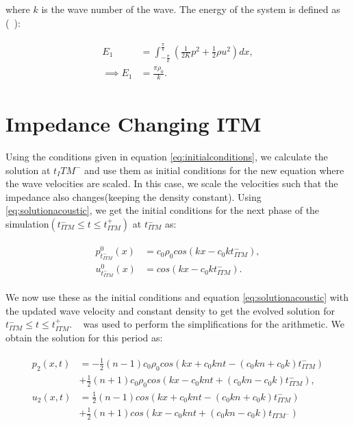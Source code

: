 where $k$ is the wave number of the wave. The energy of the system is defined as (~\parencite{Kopriva2021}):

\begin{align}
    \begin{split}
     E_1 &= \int_{-\frac{\pi}{k}}^{\frac{\pi}{k}} \left(\frac{1}{2K}p^2 + \frac{1}{2}\rho u^2\right) dx , \\
     \implies E_1 &= \frac{\pi\rho_0}{k} .
    \end{split}
    \label{eq:energy}
\end{align}

\section{Impedance Changing \ac{ITM}}\label{section:impedanceconstantITM}
Using the conditions given in equation \ref{eq:initialconditions}, we calculate the solution at $t_ITM^-$ and use them as initial conditions for the new equation where the wave velocities are scaled.
In this case, we scale the velocities such that the impedance also changes(keeping the density constant). Using \ref{eq:solutionacoustic}, we get the initial conditions for the next phase of the simulation$\left(t_{ITM}^- \leq t \leq t_{ITM}^+ \right)$ at $t_{ITM}^-$ as:

\begin{align}
    \begin{split}
        p^0_{t_{ITM}^-}\left(x\right) &= c_0 \rho_0 cos\left(kx - c_0kt_{ITM}^-\right), \\
        u^0_{t_{ITM}^-}\left(x\right) &= cos\left(kx - c_0kt_{ITM}^-\right) .
    \end{split}
\end{align}

We now use these as the initial conditions and equation \ref{eq:solutionacoustic} with the updated wave velocity and constant density to get the evolved solution for $t_{ITM}^- \leq t \leq t_{ITM}^+ $. ~\parencite{sagemath} was used to perform the simplifications for the arithmetic. We obtain the solution for this period as:

\begin{align}
    \begin{split}
        p_{2}\left(x, t\right) &= -\frac{1}{2} \left(n-1\right)c_0\rho_0cos\left(kx + c_0knt - \left(c_0kn + c_0k\right)t_{ITM}^-\right) \\
        &+ \frac{1}{2} \left(n+1\right)c_0\rho_0cos\left(kx - c_0knt + \left(c_0kn - c_0k\right)t_{ITM}^-\right), \\
        u_{2}\left(x, t\right) &= \frac{1}{2}\left(n-1\right)cos\left(kx + c_0knt - \left(c_0kn + c_0k\right)t_{ITM}^-\right)\\
        &+ \frac{1}{2}\left(n+1\right)cos\left(kx - c_0knt + \left(c_0kn-c_0k\right)t_{ITM^-}\right)
    \end{split}
\end{align}

